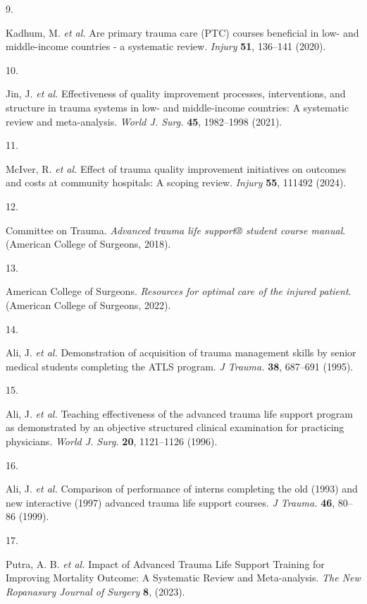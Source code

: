 \documentclass[
]{scrartcl}
\newlength{\cslhangindent}
\newlength{\csllabelwidth}
\newlength{\cslentryspacingunit} %
\newenvironment{CSLReferences}[2] %
 {%
  \setlength{\parindent}{0pt}
  \ifodd #1
  \let\oldpar\par
  \def\par{\hangindent=\cslhangindent\oldpar}
  \fi
  \setlength{\parskip}{#2\cslentryspacingunit}
 }%
 {}
\newcommand{\CSLLeftMargin}[1]{\parbox[t]{\csllabelwidth}{#1}}
\newcommand{\CSLRightInline}[1]{\parbox[t]{\linewidth - \csllabelwidth}{#1}\break}
\begin{document}
\begin{CSLReferences}{0}{0}
\leavevmode{}%
\CSLLeftMargin{9. }%
\CSLRightInline{Kadhum, M. \emph{et al.} Are primary trauma care (PTC)
courses beneficial in low- and middle-income countries - a systematic
review. \emph{Injury} \textbf{51}, 136--141 (2020).}

\leavevmode{}%
\CSLLeftMargin{10. }%
\CSLRightInline{Jin, J. \emph{et al.} Effectiveness of quality
improvement processes, interventions, and structure in trauma systems in
low- and middle-income countries: A systematic review and meta-analysis.
\emph{World J. Surg.} \textbf{45}, 1982--1998 (2021).}

\leavevmode{}%
\CSLLeftMargin{11. }%
\CSLRightInline{McIver, R. \emph{et al.} Effect of trauma quality
improvement initiatives on outcomes and costs at community hospitals:
{A} scoping review. \emph{Injury} \textbf{55}, 111492 (2024).}

\leavevmode{}%
\CSLLeftMargin{12. }%
\CSLRightInline{Committee on Trauma. \emph{Advanced trauma life support®
student course manual}. (American College of Surgeons, 2018).}

\leavevmode{}%
\CSLLeftMargin{13. }%
\CSLRightInline{American College of Surgeons. \emph{Resources for
optimal care of the injured patient}. ({American College of Surgeons},
2022).}

\leavevmode{}%
\CSLLeftMargin{14. }%
\CSLRightInline{Ali, J. \emph{et al.} Demonstration of acquisition of
trauma management skills by senior medical students completing the ATLS
program. \emph{J Trauma.} \textbf{38}, 687--691 (1995).}

\leavevmode{}%
\CSLLeftMargin{15. }%
\CSLRightInline{Ali, J. \emph{et al.} Teaching effectiveness of the
advanced trauma life support program as demonstrated by an objective
structured clinical examination for practicing physicians. \emph{World
J. Surg.} \textbf{20}, 1121--1126 (1996).}

\leavevmode{}%
\CSLLeftMargin{16. }%
\CSLRightInline{Ali, J. \emph{et al.} Comparison of performance of
interns completing the old (1993) and new interactive (1997) advanced
trauma life support courses. \emph{J Trauma.} \textbf{46}, 80--86
(1999).}

\leavevmode{}%
\CSLLeftMargin{17. }%
\CSLRightInline{Putra, A. B. \emph{et al.} Impact of {Advanced} {Trauma}
{Life} {Support} {Training} for {Improving} {Mortality} {Outcome}: {A}
{Systematic} {Review} and {Meta}-analysis. \emph{The New Ropanasury
Journal of Surgery} \textbf{8}, (2023).}


\end{CSLReferences}
\end{document}
